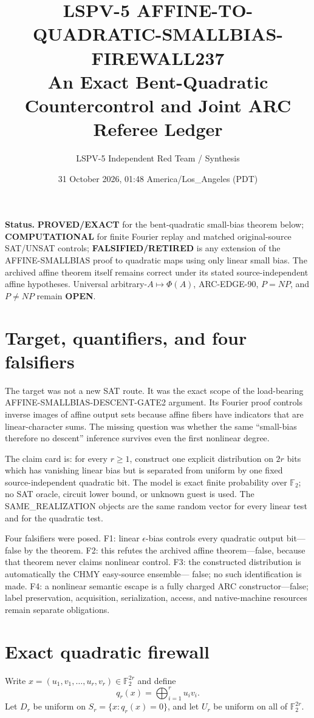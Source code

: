\documentclass[11pt]{article}
\title{LSPV-5 AFFINE-TO-QUADRATIC-SMALLBIAS-FIREWALL237\\
An Exact Bent-Quadratic Countercontrol and Joint ARC Referee Ledger}
\author{LSPV-5 Independent Red Team / Synthesis}
\date{31 October 2026, 01:48 America/Los\_Angeles (PDT)}
\begin{document}
\maketitle

\noindent\textbf{Status.}
\textbf{PROVED/EXACT} for the bent-quadratic small-bias theorem below;
\textbf{COMPUTATIONAL} for finite Fourier replay and matched original-source
SAT/UNSAT controls; \textbf{FALSIFIED/RETIRED} is any extension of the
AFFINE-SMALLBIAS proof to quadratic maps using only linear small bias.
The archived affine theorem itself remains correct under its stated
source-independent affine hypotheses.  Universal arbitrary-$A\mapsto\Phi(A)$,
ARC-EDGE-90, $P=NP$, and $P\ne NP$ remain \textbf{OPEN}.

\section{Target, quantifiers, and four falsifiers}
The target was not a new SAT route.  It was the exact scope of the load-bearing
AFFINE-SMALLBIAS-DESCENT-GATE2 argument.  Its Fourier proof controls inverse
images of affine output sets because affine fibers have indicators that are
linear-character sums.  The missing question was whether the same
``small-bias therefore no descent'' inference survives even the first nonlinear
degree.

The claim card is: for every $r\ge1$, construct one explicit distribution on
$2r$ bits which has vanishing linear bias but is separated from uniform by one
fixed source-independent quadratic bit.  The model is exact finite probability
over $\mathbb F_2$; no SAT oracle, circuit lower bound, or unknown guest is used.
The SAME\_REALIZATION objects are the same random vector for every linear test
and for the quadratic test.

Four falsifiers were posed.  F1: linear $\epsilon$-bias controls every quadratic
output bit---false by the theorem.  F2: this refutes the archived affine
theorem---false, because that theorem never claims nonlinear control.  F3: the
constructed distribution is automatically the CHMY easy-source ensemble---
false; no such identification is made.  F4: a nonlinear semantic escape is a
fully charged ARC constructor---false; label preservation, acquisition,
serialization, access, and native-machine resources remain separate obligations.

\section{Exact quadratic firewall}
Write $x=(u_1,v_1,\ldots,u_r,v_r)\in\mathbb F_2^{2r}$ and define
\[
 q_r(x)=\bigoplus_{i=1}^r u_i v_i.
\]
Let $D_r$ be uniform on $S_r=\{x:q_r(x)=0\}$, and let $U_r$ be uniform on all
of $\mathbb F_2^{2r}$.
\end{document}
